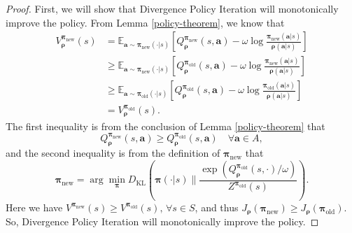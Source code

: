 \documentclass{article}
\begin{document}
	\begin{proof}
		First, we will show that Divergence Policy Iteration will monotonically improve the policy. From Lemma \ref{policy-theorem}, we know that 
		\begin{align*}
			V^{\bm{\pi}_{\operatorname{new}}}_{\bm{\rho}}(s) & = \mathbb{E}_{\bm{a} \sim \bm{\pi}_{\operatorname{new}}(\cdot | s) } \left[ 
			Q^{\bm{\pi}_{\operatorname{new}}}_{\bm{\rho}}(s,\bm{a}) - \omega \log \frac{{\bm{\pi}_{\operatorname{new}}}(\bm{a}|s)}{{\bm{\rho}}(\bm{a}|s)}
			\right] \\
			& \geq \mathbb{E}_{\bm{a} \sim \bm{\pi}_{\operatorname{new}}(\cdot | s) } \left[ Q^{\bm{\pi}_{\operatorname{old}}}_{\bm{\rho}}(s,\bm{a}) - \omega \log \frac{{\bm{\pi}_{\operatorname{new}}}(\bm{a}|s)}{{\bm{\rho}}(\bm{a}|s)} \right] \\
			& \geq \mathbb{E}_{\bm{a} \sim \bm{\pi}_{\operatorname{old}}(\cdot | s) } \left[ Q^{\bm{\pi}_{\operatorname{old}}}_{\bm{\rho}}(s,\bm{a}) - \omega \log \frac{{\bm{\pi}_{\operatorname{old}}}(\bm{a}|s)}{{\bm{\rho}}(\bm{a}|s)} \right] \\
			& = V^{\bm{\pi}_{\operatorname{old}}}_{\bm{\rho}}(s).
		\end{align*} 
		The first inequality is from the conclusion of Lemma \ref{policy-theorem} that \[Q^{\bm{\pi}_{\operatorname{new}}}_{\bm{\rho}}(s,\bm{a}) \ge Q^{\bm{\pi}_{\operatorname{old}}}_{\bm{\rho}}(s,\bm{a})\quad \forall \bm{a} \in A,\]
		and the second inequality is from the definition of $\bm{\pi}_{\operatorname{new}}$ that \[{\bm{\pi}}_{\operatorname{new}} = \arg \min_{\bm{\pi}} D_{\operatorname{KL}}\left( {\bm{\pi}}(\cdot|s) \|  \frac{\exp\left( Q^{{\bm{\pi}}_{\operatorname{{old}}}}_{\bm{\rho}}(s,\cdot) / \omega \right)}{Z^{{\bm{\pi}}_{\operatorname{{old}}}}(s)} \right).\]
		Here we have $V^{\bm{\pi}_{\operatorname{new}}}(s) \ge V^{\bm{\pi}_{\operatorname{old}}}(s),\, \forall s \in S$, and thus $J_{\bm{\rho}}(\bm{\pi}_{\operatorname{new}}) \ge J_{\bm{\rho}}(\bm{\pi}_{\operatorname{old}})$. So, Divergence Policy Iteration will monotonically improve the policy.
		

\end{proof}
\end{document}
